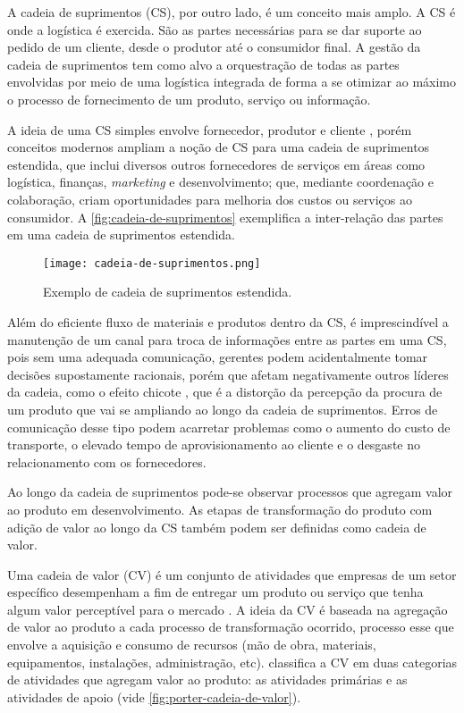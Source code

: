 	A cadeia de suprimentos (CS), por outro lado, é um conceito mais amplo. A CS é onde a logística é exercida. São as partes necessárias para se dar suporte ao pedido de um cliente, desde o produtor até o consumidor final. A gestão da cadeia de suprimentos tem como alvo a orquestração de todas as partes envolvidas por meio de uma logística integrada de forma a se otimizar ao máximo o processo de fornecimento de um produto, serviço ou informação.
	
	A ideia de uma CS simples envolve fornecedor, produtor e cliente \cite{hugos2018supplychain}, porém conceitos modernos ampliam a noção de CS para uma cadeia de suprimentos estendida, que inclui diversos outros fornecedores de serviços em áreas como logística, finanças, \textit{marketing} e desenvolvimento; que, mediante coordenação e colaboração, criam oportunidades para melhoria dos custos ou serviços ao consumidor. A \autoref{fig:cadeia-de-suprimentos} exemplifica a inter-relação das partes em uma cadeia de suprimentos estendida.
	
	\begin{figure}[htb]
		\centering
		\caption{Exemplo de cadeia de suprimentos estendida.}
		\label{fig:cadeia-de-suprimentos}
		\texttt{[image: cadeia-de-suprimentos.png]}
	\end{figure}
	
	Além do eficiente fluxo de materiais e produtos dentro da CS, é imprescindível a manutenção de um canal para troca de informações entre as partes em uma CS, pois sem uma adequada comunicação, gerentes podem acidentalmente tomar decisões supostamente racionais, porém que afetam negativamente outros líderes da cadeia, como o efeito chicote \cite{lee1997bullwhip}, que é a distorção da percepção da procura de um produto que vai se ampliando ao longo da cadeia de suprimentos. Erros de comunicação desse tipo podem acarretar problemas como o aumento do custo de transporte, o elevado tempo de aprovisionamento ao cliente e o desgaste no relacionamento com os fornecedores.
	
	Ao longo da cadeia de suprimentos pode-se observar processos que agregam valor ao produto em desenvolvimento. As etapas de transformação do produto com adição de valor ao longo da CS também podem ser definidas como cadeia de valor.
	
	Uma cadeia de valor (CV) é um conjunto de atividades que empresas de um setor específico desempenham a fim de entregar um produto ou serviço que tenha algum valor perceptível para o mercado \cite{porter1985competitiveadvantage}. A ideia da CV é baseada na agregação de valor ao produto a cada processo de transformação ocorrido, processo esse que envolve a aquisição e consumo de recursos (mão de obra, materiais, equipamentos, instalações, administração, etc).  classifica a CV em duas categorias de atividades que agregam valor ao produto: as atividades primárias e as atividades de apoio (vide \autoref{fig:porter-cadeia-de-valor}).
	
